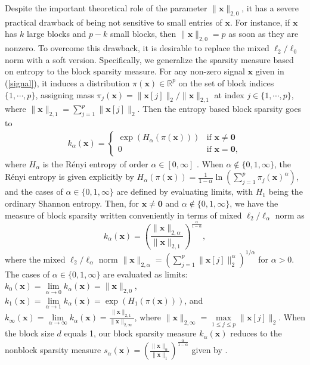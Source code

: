 \documentclass[journal,onecolumn]{IEEEtran}
\begin{document}
Despite the important theoretical role of the parameter $\lVert\mathbf{x}\rVert_{2,0}$, it has a severe practical drawback of being not sensitive to small entries of $\mathbf{x}$. For instance, if $\mathbf{x}$ has $k$ large blocks and $p-k$ small blocks, then $\lVert\mathbf{x}\rVert_{2,0}=p$ as soon as they are nonzero. To overcome this drawback, it is desirable to replace the mixed $\ell_2/\ell_0$ norm with a soft version. Specifically, we generalize the sparsity measure based on entropy to the block sparsity measure. For any non-zero signal $\mathbf{x}$ given in (\ref{signal}), it induces a distribution $\pi(\mathbf{x})\in\mathbb{R}^p$ on the set of block indices $\{1,\cdots,p\}$, assigning mass $\pi_j(\mathbf{x})=\lVert\mathbf{x}[j]\rVert_2/\lVert\mathbf{x}\rVert_{2,1}$ at index $j\in\{1,\cdots,p\}$, where $\lVert\mathbf{x}\rVert_{2,1}=\sum_{j=1}^{p}\lVert\mathbf{x}[j]\rVert_2$. Then the entropy based block sparsity goes to
\begin{align}
k_{\alpha}(\mathbf{x})=\begin{cases}
\exp(H_{\alpha}(\pi(\mathbf{x}))) & \text{if $\mathbf{x}\neq \mathbf{0}$}\\
0 & \text{if $\mathbf{x}=\mathbf{0}$},
\end{cases}
\end{align}
where $H_\alpha$ is the R\'{e}nyi entropy of order $\alpha\in[0,\infty]$ \cite{l2,pv,v}. When $\alpha\notin\{0,1,\infty\}$, the R\'{e}nyi entropy is given explicitly by $H_{\alpha}(\pi(\mathbf{x}))=\frac{1}{1-\alpha}\ln(\sum_{j=1}^p\pi_{j}(\mathbf{x})^\alpha)$, and the cases of $\alpha\in\{0,1,\infty\}$ are defined by evaluating limits, with $H_1$ being the ordinary Shannon entropy. Then, for $\mathbf{x}\neq \mathbf{0}$ and $\alpha\notin\{0,1,\infty\}$, we have the measure of block sparsity written conveniently in terms of mixed $\ell_2/\ell_\alpha$ norm as $$
k_\alpha(\mathbf{x})=\left(\frac{\lVert\mathbf{x}\rVert_{2,\alpha}}{\lVert\mathbf{x}\rVert_{2,1}}\right)^{\frac{\alpha}{1-\alpha}},
$$
where the mixed $\ell_2/\ell_\alpha$ norm $\lVert\mathbf{x}\rVert_{2,\alpha}=\left(\sum_{j=1}^{p}\lVert\mathbf{x}[j]\rVert_2^{\alpha}\right)^{1/\alpha}$ for $\alpha>0$. The cases of $\alpha\in\{0,1,\infty\}$ are evaluated as limits: $k_0(\mathbf{x})=\lim\limits_{\alpha\rightarrow 0}k_{\alpha}(\mathbf{x})=\lVert\mathbf{x}\rVert_{2,0}$, $k_1(\mathbf{x})=\lim\limits_{\alpha\rightarrow 1}k_{\alpha}(\mathbf{x})=\exp(H_1(\pi(\mathbf{x})))$, and $k_\infty(\mathbf{x})=\lim\limits_{\alpha\rightarrow \infty}k_{\alpha}(\mathbf{x})=\frac{\lVert\mathbf{x}\rVert_{2,1}}{\lVert\mathbf{x}\rVert_{2,\infty}}$, where $\lVert\mathbf{x}\rVert_{2,\infty}=\max\limits_{1\leq j\leq p}\lVert\mathbf{x}[j]\rVert_{2}$. When the block size $d$ equals 1, our block sparsity measure $k_{\alpha}(\mathbf{x})$ reduces to the nonblock sparsity measure $s_\alpha(\mathbf{x})=\left(\frac{\lVert\mathbf{x}\rVert_{\alpha}}{\lVert\mathbf{x}\rVert_{1}}\right)^{\frac{\alpha}{1-\alpha}}$ given by \cite{l2}.
\end{document}
